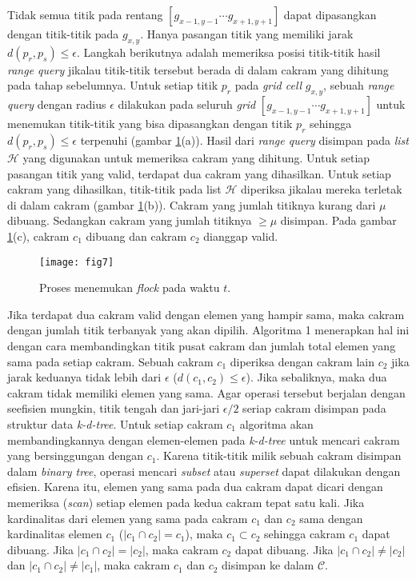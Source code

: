 \par Tidak semua titik pada rentang $[g_{x-1,y-1}\cdots g_{x+1,y+1}]$ dapat dipasangkan dengan titik-titik pada $g_{x,y}$. Hanya pasangan titik yang memiliki jarak $d(p_r,p_s)\leq\epsilon$. Langkah berikutnya adalah memeriksa posisi titik-titik hasil \textit{range query} jikalau titik-titik tersebut berada di dalam cakram yang dihitung pada tahap sebelumnya. Untuk setiap titik $p_r$ pada \textit{grid cell} $g_{x,y}$, sebuah \textit{range query} dengan radius $\epsilon$ dilakukan pada seluruh \textit{grid} $[g_{x-1,y-1}\cdots g_{x+1,y+1}]$ untuk menemukan titik-titik yang bisa dipasangkan dengan titik $p_r$ sehingga $d(p_r,p_s)\leq \epsilon$ terpenuhi (gambar \ref{fig:fig7}(a)). Hasil dari \textit{range query} disimpan pada \textit{list} $\mathcal{H}$ yang digunakan untuk memeriksa cakram yang dihitung. Untuk setiap pasangan titik yang valid, terdapat dua cakram yang dihasilkan. Untuk setiap cakram yang dihasilkan, titik-titik pada list $\mathcal{H}$ diperiksa jikalau mereka terletak di dalam cakram (gambar \ref{fig:fig7}(b)). Cakram yang jumlah titiknya kurang dari $\mu$ dibuang. Sedangkan cakram yang jumlah titiknya $\geq\mu$ disimpan. Pada gambar \ref{fig:fig7}(c), cakram $c_1$ dibuang dan cakram $c_2$ dianggap valid.

\begin{figure}[H]
	\centering  
	\texttt{[image: fig7]}  
	\caption{Proses menemukan \textit{flock} pada waktu $t$.} 
	\label{fig:fig7} 
\end{figure}

\par Jika terdapat dua cakram valid dengan elemen yang hampir sama, maka cakram dengan jumlah titik terbanyak yang akan dipilih. Algoritma 1 menerapkan hal ini dengan cara membandingkan titik pusat cakram dan jumlah total elemen yang sama pada setiap cakram. Sebuah cakram $c_1$ diperiksa dengan cakram lain $c_2$ jika jarak keduanya tidak lebih dari $\epsilon$ ($d(c_1,c_2)\leq\epsilon$). Jika sebaliknya, maka dua cakram tidak memiliki elemen yang sama. Agar operasi tersebut berjalan dengan seefisien mungkin, titik tengah dan jari-jari $\epsilon/2$ seriap cakram disimpan pada struktur data \textit{k-d-tree}. Untuk setiap cakram $c_1$ algoritma akan membandingkannya dengan elemen-elemen pada \textit{k-d-tree} untuk mencari cakram yang bersinggungan dengan $c_1$. Karena titik-titik milik sebuah cakram disimpan dalam \textit{binary tree}, operasi mencari \textit{subset} atau \textit{superset} dapat dilakukan dengan efisien. Karena itu, elemen yang sama pada dua cakram dapat dicari dengan memeriksa (\textit{scan}) setiap elemen pada kedua cakram tepat satu kali. Jika kardinalitas dari elemen yang sama pada cakram $c_1$ dan $c_2$ sama dengan kardinalitas elemen $c_1$ ($|c_1\cap c_2|=c_1$), maka $c_1\subset c_2$ sehingga cakram $c_1$ dapat dibuang. Jika $|c_1\cap c_2|=|c_2|$, maka cakram $c_2$ dapat dibuang. Jika $|c_1\cap c_2|\neq|c_2|$ dan $|c_1\cap c_2|\neq|c_1|$, maka cakram $c_1$ dan $c_2$ disimpan ke dalam $\mathcal{C}$. 


